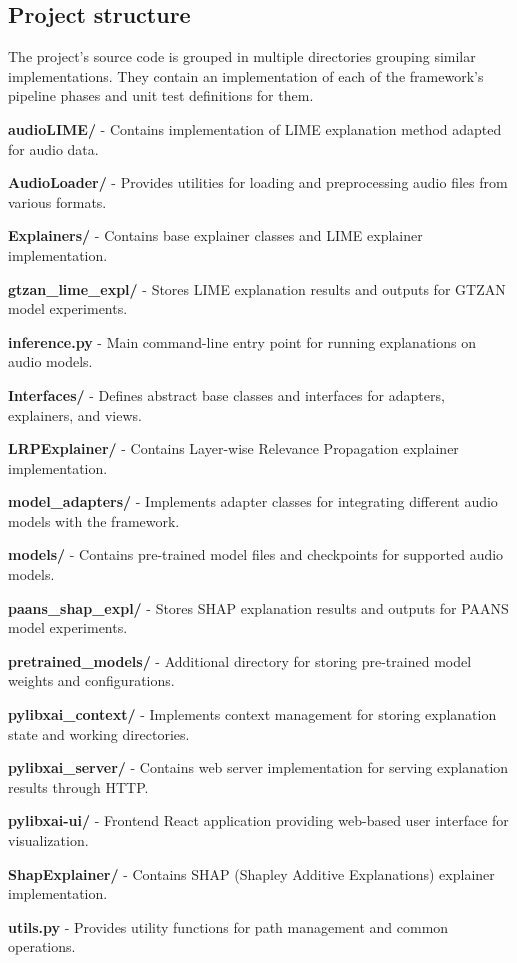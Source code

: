 \documentclass[
    bindingoffset=5mm,  %
    footnoteindent=3mm, %
    hyphenation=true    %
]{src/wut-thesis}
\begin{document}
\subsection{Project structure}

    The project’s source code is grouped in multiple directories grouping similar implementations. They contain an implementation of each of the framework’s pipeline phases
    and unit test definitions for them.

\begin{description}
	\item \textbf{audioLIME/} - Contains implementation of LIME explanation method adapted for audio data.
	\item \textbf{AudioLoader/} - Provides utilities for loading and preprocessing audio files from various formats.
	\item \textbf{Explainers/} - Contains base explainer classes and LIME explainer implementation.
	\item \textbf{gtzan\_lime\_expl/} - Stores LIME explanation results and outputs for GTZAN model experiments.
	\item \textbf{inference.py} - Main command-line entry point for running explanations on audio models.
	\item \textbf{Interfaces/} - Defines abstract base classes and interfaces for adapters, explainers, and views.
	\item \textbf{LRPExplainer/} - Contains Layer-wise Relevance Propagation explainer implementation.
	\item \textbf{model\_adapters/} - Implements adapter classes for integrating different audio models with the framework.
	\item \textbf{models/} - Contains pre-trained model files and checkpoints for supported audio models.
	\item \textbf{paans\_shap\_expl/} - Stores SHAP explanation results and outputs for PAANS model experiments.
	\item \textbf{pretrained\_models/} - Additional directory for storing pre-trained model weights and configurations.
	\item \textbf{pylibxai\_context/} - Implements context management for storing explanation state and working directories.
	\item \textbf{pylibxai\_server/} - Contains web server implementation for serving explanation results through HTTP.
	\item \textbf{pylibxai-ui/} - Frontend React application providing web-based user interface for visualization.
	\item \textbf{ShapExplainer/} - Contains SHAP (Shapley Additive Explanations) explainer implementation.
	\item \textbf{utils.py} - Provides utility functions for path management and common operations.
\end{description}
\end{document}
